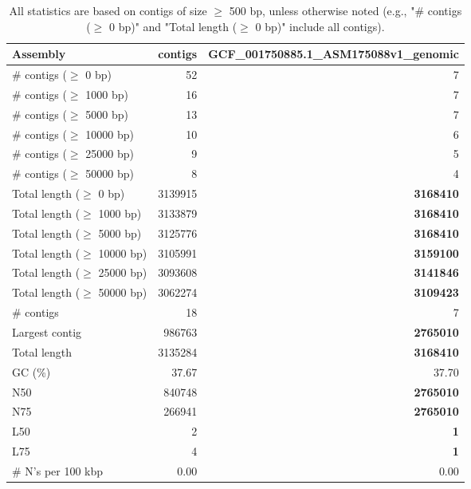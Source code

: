 \documentclass[12pt,a4paper]{article}
\begin{document}
\begin{table}[ht]
\begin{center}
\caption{All statistics are based on contigs of size $\geq$ 500 bp, unless otherwise noted (e.g., "\# contigs ($\geq$ 0 bp)" and "Total length ($\geq$ 0 bp)" include all contigs).}
\begin{tabular}{|l*{2}{|r}|}
\hline
Assembly & contigs & GCF\_001750885.1\_ASM175088v1\_genomic \\ \hline
\# contigs ($\geq$ 0 bp) & 52 & 7 \\ \hline
\# contigs ($\geq$ 1000 bp) & 16 & 7 \\ \hline
\# contigs ($\geq$ 5000 bp) & 13 & 7 \\ \hline
\# contigs ($\geq$ 10000 bp) & 10 & 6 \\ \hline
\# contigs ($\geq$ 25000 bp) & 9 & 5 \\ \hline
\# contigs ($\geq$ 50000 bp) & 8 & 4 \\ \hline
Total length ($\geq$ 0 bp) & 3139915 & {\bf 3168410} \\ \hline
Total length ($\geq$ 1000 bp) & 3133879 & {\bf 3168410} \\ \hline
Total length ($\geq$ 5000 bp) & 3125776 & {\bf 3168410} \\ \hline
Total length ($\geq$ 10000 bp) & 3105991 & {\bf 3159100} \\ \hline
Total length ($\geq$ 25000 bp) & 3093608 & {\bf 3141846} \\ \hline
Total length ($\geq$ 50000 bp) & 3062274 & {\bf 3109423} \\ \hline
\# contigs & 18 & 7 \\ \hline
Largest contig & 986763 & {\bf 2765010} \\ \hline
Total length & 3135284 & {\bf 3168410} \\ \hline
GC (\%) & 37.67 & 37.70 \\ \hline
N50 & 840748 & {\bf 2765010} \\ \hline
N75 & 266941 & {\bf 2765010} \\ \hline
L50 & 2 & {\bf 1} \\ \hline
L75 & 4 & {\bf 1} \\ \hline
\# N's per 100 kbp & 0.00 & 0.00 \\ \hline
\end{tabular}
\end{center}
\end{table}
\end{document}
